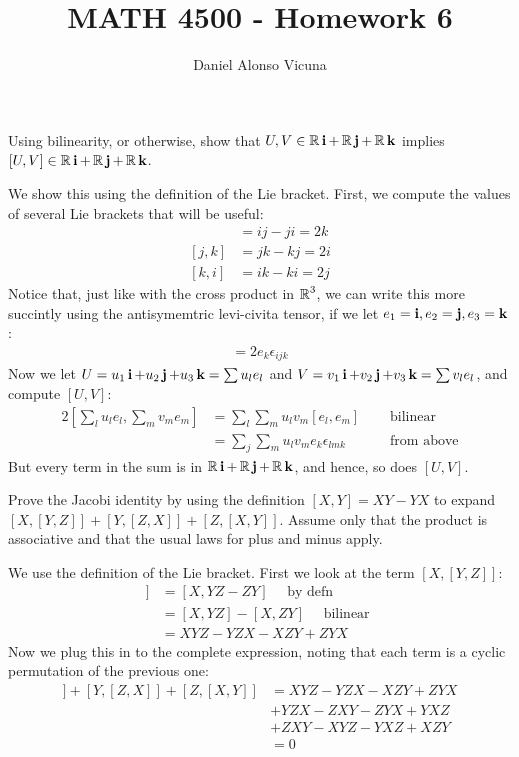 \documentclass[12pt,onecolumn]{article}
\title{MATH 4500 - Homework 6}
\author{Daniel Alonso Vicuna}
\begin{document}
\maketitle

\begin{exercise}
Using bilinearity, or otherwise, show that $U,V \in \operatorname{\mathbb{R}} \operatorname{\textbf{i}}+ \operatorname{\mathbb{R}} \operatorname{\textbf{j}}+ \operatorname{\mathbb{R}} \operatorname{\textbf{k}}$ implies $[U,V] \in  \operatorname{\mathbb{R}} \operatorname{\textbf{i}}+ \operatorname{\mathbb{R}} \operatorname{\textbf{j}}+ \operatorname{\mathbb{R}} \operatorname{\textbf{k}}$.
\end{exercise}
\begin{answer}
We show this using the definition of the Lie bracket. First, we compute the values of several Lie brackets that will be useful:
\begin{align*}
    [i,j] &= ij - ji = 2k \\
    [j,k] &= jk - kj = 2i \\
    [k,i] &= ik - ki = 2j 
\end{align*}
Notice that, just like with the cross product in $\operatorname{\mathbb{R}}^3$, we can write this more succintly using the antisymemtric levi-civita tensor, if we let $e_1=\operatorname{\textbf{i}}, e_2=\operatorname{\textbf{j}}, e_3=\operatorname{\textbf{k}}$:
\begin{align*}
    [e_i, e_j] = 2 e_k \epsilon_{ijk}
\end{align*}
Now we let $U = u_1\operatorname{\textbf{i}} + u_2\operatorname{\textbf{j}} + u_3\operatorname{\textbf{k}} = \sum u_l e_l$ and $V = v_1\operatorname{\textbf{i}} + v_2\operatorname{\textbf{j}} + v_3\operatorname{\textbf{k}} = \sum v_l e_l$, and compute $[U,V]$:
\begin{alignat*}{2}
    [\sum_l u_l e_l, \sum_m v_m e_m] &= \sum_l \sum_m u_l v_m [e_l,e_m] \quad &\text{ bilinear} \\
    &= \sum_j \sum_m u_l v_m e_k \epsilon_{lmk} \quad &\text{ from above}
\end{alignat*}
But every term in the sum is in $\operatorname{\mathbb{R}}\operatorname{\textbf{i}} + \operatorname{\mathbb{R}}\operatorname{\textbf{j}} + \operatorname{\mathbb{R}}\operatorname{\textbf{k}}$, and hence, so does $[U,V]$.
\end{answer}
\begin{exercise}
Prove the Jacobi identity by using the deﬁnition $[X,Y]=XY-YX$ to expand $[X,[Y,Z]]+[Y,[Z,X]]+[Z,[X,Y]]$. Assume only that the product is associative and that the usual laws for plus and minus apply. 
\end{exercise}
\begin{answer}
We use the definition of the Lie bracket. First we look at the term $[X,[Y,Z]]$:
\begin{align*}
    [X,[Y,Z]] &= [X,YZ - ZY] \quad \text{ by defn } \\
    &= [X,YZ] - [X,ZY] \quad \text{ bilinear } \\
    &= XYZ - YZX - XZY + ZYX
\end{align*}
Now we plug this in to the complete expression, noting that each term is a cyclic permutation of the previous one:
\begin{align*}
    [X,[Y,Z]]+[Y,[Z,X]]+[Z,[X,Y]] &= XYZ - YZX - XZY + ZYX \\
    &+ YZX - ZXY - ZYX + YXZ \\
    &+ ZXY - XYZ - YXZ + XZY \\
    &= 0
\end{align*}
\end{answer}
\end{document}
